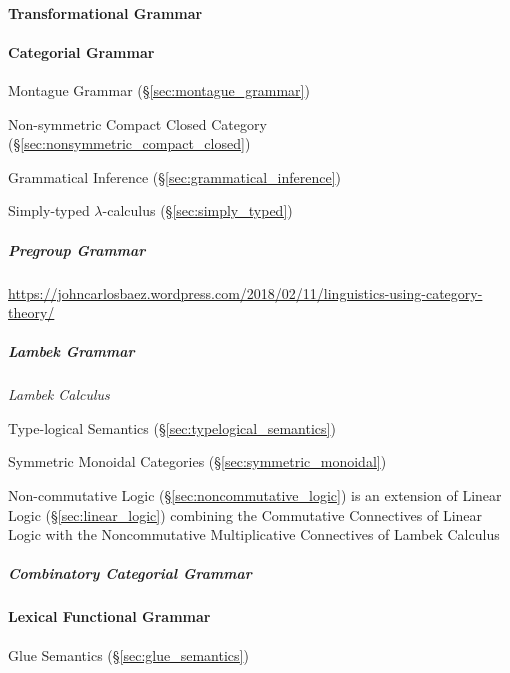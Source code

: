 \paragraph{Transformational Grammar}\label{sec:transformational_grammar}
\hfill



\paragraph{Categorial Grammar}\label{sec:categorial_grammar}\hfill

Montague Grammar (\S\ref{sec:montague_grammar})

Non-symmetric Compact Closed Category (\S\ref{sec:nonsymmetric_compact_closed})

\fist Grammatical Inference (\S\ref{sec:grammatical_inference})

\fist Simply-typed $\lambda$-calculus (\S\ref{sec:simply_typed})



\subparagraph{Pregroup Grammar}\label{sec:pregroup_grammar}\hfill

\url{https://johncarlosbaez.wordpress.com/2018/02/11/linguistics-using-category-theory/}



\subparagraph{Lambek Grammar}\label{sec:lambek_grammar}\hfill

\emph{Lambek Calculus}

Type-logical Semantics (\S\ref{sec:typelogical_semantics})

Symmetric Monoidal Categories (\S\ref{sec:symmetric_monoidal})

\fist Non-commutative Logic (\S\ref{sec:noncommutative_logic}) is an extension
of Linear Logic (\S\ref{sec:linear_logic}) combining the Commutative Connectives
of Linear Logic with the Noncommutative Multiplicative Connectives of Lambek
Calculus



\subparagraph{Combinatory Categorial Grammar}\hfill
\label{sec:combinatory_categorial}



\paragraph{Lexical Functional Grammar}\label{sec:lexical_functional}
\hfill

Glue Semantics (\S\ref{sec:glue_semantics})



